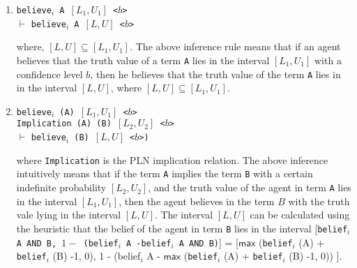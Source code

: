 \documentclass[12pt]{article}
\begin{document}
\begin{enumerate}

\item
\texttt{believe$_i$ A $[L_1,U_1]$ <$b$>}\\
$\vdash$
\texttt{believe$_i$ A $[L,U]$ <$b$>}

where, $[L,U]\subseteq [L_1,U_1]$. The above inference rule means that if an agent believes that the truth value of a term \texttt{A} lies in the interval $[L_1,U_1]$ with a confidence level $b$, then he believes that the truth value of the term \texttt{A} lies in in the interval $[L,U]$, where $[L,U]\subseteq [L_1,U_1]$. \\
\item
\texttt{believe$_i$ (A) $[L_1,U_1]$ <$b$>}\\
\texttt{Implication (A) (B) $[L_2,U_2]$ <$b$>}\\
$\vdash$
\texttt{believe$_i$ (B) $[L,U]$ <$b$>) }

where \texttt{Implication} is the PLN implication relation. The above inference intuitively means that if the term \texttt{A} implies the term \texttt{B} with a certain indefinite probability $[L_2,U_2]$, and the truth value of the agent in term \texttt{A} lies in the interval $[L_1,U_1]$, then the agent believes in the term $B$ with the truth vale lying in the interval $[L,U]$. The interval $[L,U]$ can be calculated using the heuristic that the belief of the agent in term \texttt{B} lies in the interval [\texttt{belief$_i$ A AND B, $1-$ (belief$_i$ A -belief$_i$ A AND B)}] = [$\mathsf{max}$ (\texttt{belief}$_i$ (A) + \texttt{belief}$_i$ (B) -1, 0), 1 - (belief$_i$ A - $\mathsf{max}$ (\texttt{belief}$_i$ (A) + \texttt{belief}$_i$ (B) -1, 0)) ].   \\





\end{enumerate}
\end{document}
